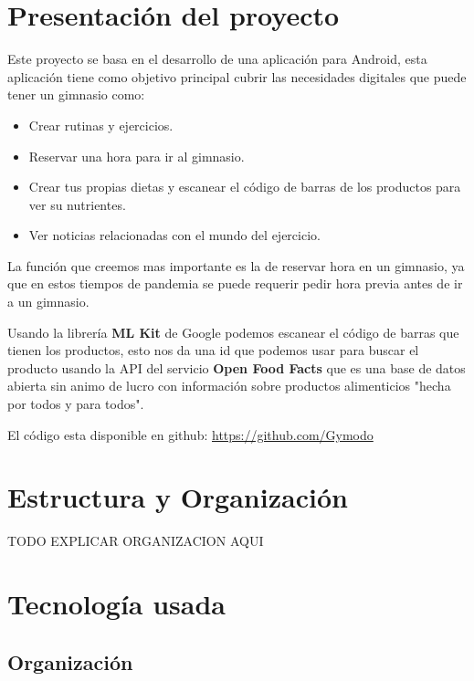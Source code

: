 \documentclass[12pt,a4paper]{article}
\begin{document}
\newpage

\tableofcontents

\newpage

\section{Presentación del proyecto}
Este proyecto se basa en el desarrollo de una aplicación para Android, esta aplicación tiene como objetivo principal cubrir las necesidades digitales que puede tener un gimnasio como:

\begin{itemize}
\item Crear rutinas y ejercicios.
\item Reservar una hora para ir al gimnasio.
\item Crear tus propias dietas y escanear el código de barras de los productos para ver su nutrientes.
\item Ver noticias relacionadas con el mundo del ejercicio.
\end{itemize}

La función que creemos mas importante es la de reservar hora en un gimnasio, ya que en estos tiempos de pandemia se puede requerir pedir hora previa antes de ir a un gimnasio.

Usando la librería \textbf{ML Kit} de Google podemos escanear el código de barras que tienen los productos, esto nos da una id que podemos usar para buscar el producto usando la API del servicio \textbf{Open Food Facts} que es una base de datos abierta sin animo de lucro con información sobre productos alimenticios "hecha por todos y para todos".


El código esta disponible en github: \href{https://github.com/Gymodo}{https://github.com/Gymodo}

\newpage

\section{Estructura y Organización}
TODO EXPLICAR ORGANIZACION AQUI

\newpage

\section{Tecnología usada}

\subsection{Organización}
\end{document}
